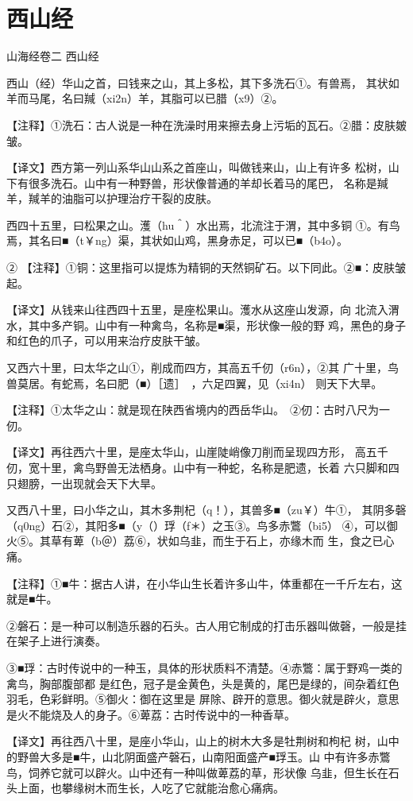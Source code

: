 \documentclass[a4paper,12pt,UTF8,twoside]{ctexbook}
\begin{document}
\chapter{西山经}

山海经卷二 西山经

西山（经）华山之首，曰钱来之山，其上多松，其下多洗石①。有兽焉， 其状如羊而马尾，名曰羬（xi2n）羊，其脂可以已腊（x9）②。

【注释】①洗石：古人说是一种在洗澡时用来擦去身上污垢的瓦石。②腊：皮肤皴皱。

【译文】西方第一列山系华山山系之首座山，叫做钱来山，山上有许多 松树，山下有很多洗石。山中有一种野兽，形状像普通的羊却长着马的尾巴， 名称是羬羊，羬羊的油脂可以护理治疗干裂的皮肤。

西四十五里，曰松果之山。濩（hu＾）水出焉，北流注于渭，其中多铜 ①。有鸟焉，其名曰■（t￥ng）渠，其状如山鸡，黑身赤足，可以已■（b4o）。

② 【注释】①铜：这里指可以提炼为精铜的天然铜矿石。以下同此。②■：皮肤皱起。

【译文】从钱来山往西四十五里，是座松果山。濩水从这座山发源，向 北流入渭水，其中多产铜。山中有一种禽鸟，名称是■渠，形状像一般的野 鸡，黑色的身子和红色的爪子，可以用来治疗皮肤干皱。

又西六十里，曰太华之山①，削成而四方，其高五千仞（r6n），②其 广十里，鸟兽莫居。有蛇焉，名曰肥（■）［遗］　，六足四翼，见（xi4n） 则天下大旱。

【注释】①太华之山：就是现在陕西省境内的西岳华山。　②仞：古时八尺为一仞。

【译文】再往西六十里，是座太华山，山崖陡峭像刀削而呈现四方形， 高五千仞，宽十里，禽鸟野兽无法栖身。山中有一种蛇，名称是肥遗，长着 六只脚和四只翅膀，一出现就会天下大旱。

又西八十里，曰小华之山，其木多荆杞（q！），其兽多■（zu￥）牛①， 其阴多磬（q0ng）石②，其阳多■（y（）琈（f＊）之玉③。鸟多赤鷩（bi5） ④，可以御火⑤。其草有萆（b＠）荔⑥，状如乌韭，而生于石上，亦缘木而 生，食之已心痛。

【注释】①■牛：据古人讲，在小华山生长着许多山牛，体重都在一千斤左右，这就是■牛。

②磐石：是一种可以制造乐器的石头。古人用它制成的打击乐器叫做磬，一般是挂在架子上进行演奏。

③■琈：古时传说中的一种玉，具体的形状质料不清楚。④赤鷩：属于野鸡一类的禽鸟，胸部腹部都 是红色，冠子是金黄色，头是黄的，尾巴是绿的，间杂着红色羽毛，色彩鲜明。⑤御火：御在这里是 屏除、辟开的意思。御火就是辟火，意思是火不能烧及人的身子。⑥萆荔：古时传说中的一种香草。

【译文】再往西八十里，是座小华山，山上的树木大多是牡荆树和枸杞 树，山中的野兽大多是■牛，山北阴面盛产磬石，山南阳面盛产■琈玉。山 中有许多赤鷩鸟，饲养它就可以辟火。山中还有一种叫做萆荔的草，形状像 乌韭，但生长在石头上面，也攀缘树木而生长，人吃了它就能治愈心痛病。
\end{document}

